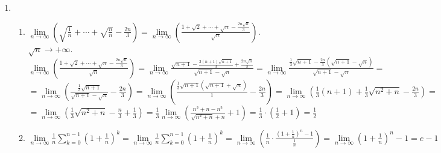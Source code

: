 \documentclass[a4paper]{article}
\begin{document}
\begin{enumerate}
    \item 
    \begin{enumerate}
        \item $\lim\limits_{n\rightarrow\infty}(\sqrt{\frac{1}{n}} + \cdots + \sqrt{\frac{n}{n}} - \frac{2n}{3}) = \lim\limits_{n\rightarrow\infty}(\frac{1 + \sqrt{2} + \cdots + \sqrt{n} - \frac{2n\sqrt{n}}{3}}{\sqrt{n}})$. $\sqrt{n}\rightarrow+\infty$.\\
        $\lim\limits_{n\rightarrow\infty}(\frac{1 + \sqrt{2} + \cdots + \sqrt{n} - \frac{2n\sqrt{n}}{3}}{\sqrt{n}}) = \lim\limits_{n\rightarrow\infty}\frac{\sqrt{n+1} - \frac{2(n+1)\sqrt{n+1}}{3} + \frac{2n\sqrt{n}}{3}}{\sqrt{n+1} - \sqrt{n}} = \lim\limits_{n\rightarrow\infty}\frac{\frac{1}{3}\sqrt{n+1}-\frac{2n}{3}(\sqrt{n+1} - \sqrt{n})}{\sqrt{n+1}-\sqrt{n}}=$\\
        $= \lim\limits_{n\rightarrow\infty}(\frac{\frac{1}{3}\sqrt{n+1}}{\sqrt{n+1}-\sqrt{n}} - \frac{2n}{3}) = \lim\limits_{n\rightarrow\infty}(\frac{\frac{1}{3}\sqrt{n+1}(\sqrt{n+1} + \sqrt{n})}{1} - \frac{2n}{3}) = \lim\limits_{n\rightarrow\infty}(\frac{1}{3}(n+1) + \frac{1}{3}\sqrt{n^2 + n} - \frac{2n}{3}) = $\\
        $=\lim\limits_{n\rightarrow\infty}(\frac{1}{3}\sqrt{n^2 + n} - \frac{n}{3} + \frac{1}{3}) = \frac{1}{3}\lim\limits_{n\rightarrow\infty}(\frac{n^2 + n - n^2}{\sqrt{n^2 + n} + n} + 1) = \frac{1}{3}\cdot(\frac{1}{2} + 1) = \frac{1}{2}$ 
        \item $\lim\limits_{n\rightarrow\infty}\frac{1}{n}\sum_{k=0}^{n-1}(1 + \frac{1}{n})^k = \lim\limits_{n\rightarrow\infty}\frac{1}{n}\sum_{k=0}^{n-1}(1+\frac{1}{n})^k = \lim\limits_{n\rightarrow\infty}(\frac{1}{n}\cdot \frac{(1 + \frac{1}{n})^n - 1}{\frac{1}{n}}) =\lim\limits_{n\rightarrow\infty}(1 + \frac{1}{n})^n - 1 =e - 1$
    \end{enumerate}
\end{enumerate}
\end{document}

